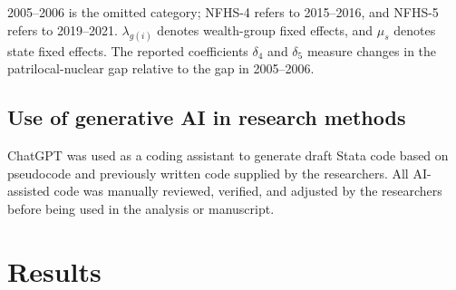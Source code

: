 \documentclass[10pt,twoside,reqno]{article}
\begin{document}
2005--2006 is the omitted category; NFHS-4 refers to 2015--2016, and NFHS-5 refers to 2019--2021. $\lambda_{g(i)}$ denotes wealth-group fixed effects, and $\mu_s$ denotes state fixed effects. The reported coefficients $\delta_4$ and $\delta_5$ measure changes in the patrilocal-nuclear gap relative to the gap in 2005--2006.


\subsection*{Use of generative AI in research methods}
ChatGPT was used as a coding assistant to generate draft Stata code based on pseudocode and previously written code supplied by the researchers. All AI-assisted code was manually reviewed, verified, and adjusted by the researchers before being used in the analysis or manuscript.


\section*{Results}



\end{document}

